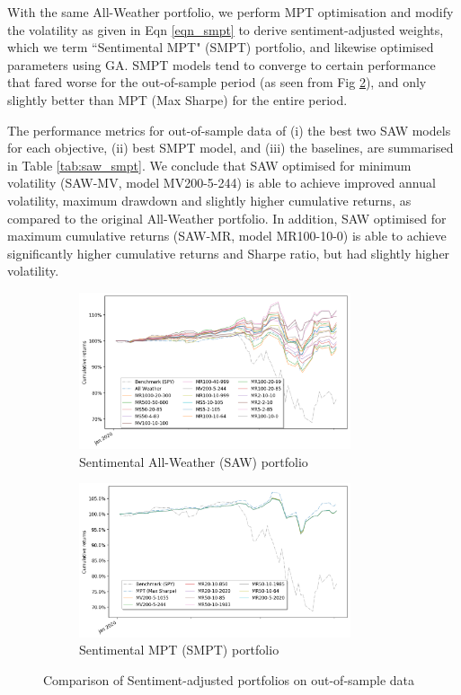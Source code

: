 \documentclass{article}
\begin{document}
With the same All-Weather portfolio, we perform MPT optimisation and modify the volatility as given in Eqn \ref{eqn_smpt} to derive sentiment-adjusted weights, which we term ``Sentimental MPT" (SMPT) portfolio, and likewise optimised parameters using GA. SMPT models tend to converge to certain performance that fared worse for the out-of-sample period (as seen from Fig \ref{figure_smpt}), and only slightly better than MPT (Max Sharpe) for the entire period.

The performance metrics for out-of-sample data of (i) the best two SAW models for each objective, (ii) best SMPT model, and (iii) the baselines, are summarised in Table \ref{tab:saw_smpt}. We conclude that SAW optimised for minimum volatility (SAW-MV, model MV200-5-244) is able to achieve improved annual volatility, maximum drawdown and slightly higher cumulative returns, as compared to the original All-Weather portfolio. In addition, SAW optimised for maximum cumulative returns (SAW-MR, model MR100-10-0) is able to achieve significantly higher cumulative returns and Sharpe ratio, but had slightly higher volatility.


\begin{figure}
\begin{subfigure}[t]{8cm}
    \includegraphics[width=8cm]{figure_saw.png}
    \caption{Sentimental All-Weather (SAW) portfolio \label{figure_saw}}
\end{subfigure}
\begin{subfigure}[t]{8cm}
    \includegraphics[width=8cm]{figure_smpt.png}
    \caption{Sentimental MPT (SMPT) portfolio \label{figure_smpt}}
\end{subfigure}
\caption{Comparison of Sentiment-adjusted portfolios on out-of-sample data \label{figure_saw_smpt}}

\end{figure}
\end{document}
